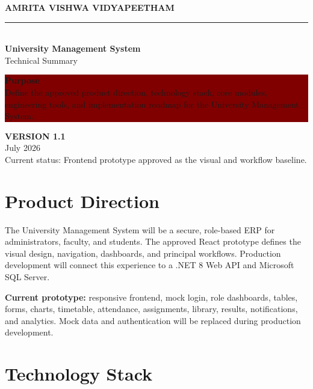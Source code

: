 \documentclass[10pt,a4paper]{article}
\begin{document}
\begin{titlepage}
\pagecolor{darkmaroon}
\color{white}
\vspace*{2cm}
{\Large\textbf{AMRITA VISHWA VIDYAPEETHAM}}\\[0.3cm]
{\color{gold}\rule{\textwidth}{1.2pt}}\\[1.5cm]
{\Huge\bfseries University Management System}\\[0.5cm]
{\LARGE Technical Summary}\\[1.2cm]

\colorbox{maroon}{\parbox{\dimexpr\textwidth-2\fboxsep}{
\vspace{3mm}
\textbf{Purpose}\\
Define the approved product direction, technology stack, core modules,
engineering tools, and implementation roadmap for the University Management System.
\vspace{3mm}
}}

\vfill
{\color{gold}\textbf{VERSION 1.1}}\\
July 2026\\[0.5cm]
{\small Current status: Frontend prototype approved as the visual and workflow baseline.}
\end{titlepage}
\nopagecolor
\color{black}

\section{Product Direction}

The University Management System will be a secure, role-based ERP for
administrators, faculty, and students. The approved React prototype defines the
visual design, navigation, dashboards, and principal workflows. Production
development will connect this experience to a .NET 8 Web API and Microsoft SQL
Server.

\textbf{Current prototype:} responsive frontend, mock login, role dashboards,
tables, forms, charts, timetable, attendance, assignments, library, results,
notifications, and analytics. Mock data and authentication will be replaced
during production development.

\section{Technology Stack}
\end{document}
